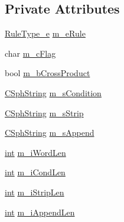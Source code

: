 \subsection*{Private Attributes}
\begin{DoxyCompactItemize}
\item 
\hyperlink{spelldump_8cpp_a64a5bdd2a31b6b4ea79d491b81ea0a1c}{Rule\-Type\-\_\-e} \hyperlink{classCISpellAffixRule_a8dccbe47782c84f9ebe73fbd02e8ca32}{m\-\_\-e\-Rule}
\item 
char \hyperlink{classCISpellAffixRule_a6295e3422c29e64d7e7b9c7d046bfd27}{m\-\_\-c\-Flag}
\item 
bool \hyperlink{classCISpellAffixRule_a13defbb631de5b0209ec803fdf1c7d74}{m\-\_\-b\-Cross\-Product}
\item 
\hyperlink{structCSphString}{C\-Sph\-String} \hyperlink{classCISpellAffixRule_a8a940c1a5a8c35a8982c8ad998424772}{m\-\_\-s\-Condition}
\item 
\hyperlink{structCSphString}{C\-Sph\-String} \hyperlink{classCISpellAffixRule_af16db690d0785a6906f4be50f14e1eea}{m\-\_\-s\-Strip}
\item 
\hyperlink{structCSphString}{C\-Sph\-String} \hyperlink{classCISpellAffixRule_aad91d84548c2fe0b699d4fd715c1675b}{m\-\_\-s\-Append}
\item 
\hyperlink{sphinxexpr_8cpp_a4a26e8f9cb8b736e0c4cbf4d16de985e}{int} \hyperlink{classCISpellAffixRule_ad44297473682f3d0222ca7135b15694c}{m\-\_\-i\-Word\-Len}
\item 
\hyperlink{sphinxexpr_8cpp_a4a26e8f9cb8b736e0c4cbf4d16de985e}{int} \hyperlink{classCISpellAffixRule_a5c91ca614f6d1ed3231324f39831eb4c}{m\-\_\-i\-Cond\-Len}
\item 
\hyperlink{sphinxexpr_8cpp_a4a26e8f9cb8b736e0c4cbf4d16de985e}{int} \hyperlink{classCISpellAffixRule_aac9fae1dc9801e813c84a0ae3946d3cf}{m\-\_\-i\-Strip\-Len}
\item 
\hyperlink{sphinxexpr_8cpp_a4a26e8f9cb8b736e0c4cbf4d16de985e}{int} \hyperlink{classCISpellAffixRule_a3de35e2f00e76058dd0f188428aef9ef}{m\-\_\-i\-Append\-Len}
\end{DoxyCompactItemize}


